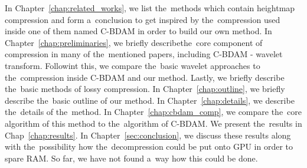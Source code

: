 In Chapter~\ref{chap:related_works}, we list the~methods which contain heightmap compression and form a~conclusion to get inspired by the~compression used inside one of them named C-BDAM in order to build our own method. In Chapter~\ref{chap:preliminaries}, we briefly describethe~core component of compression in many of the~mentioned papers, including C-BDAM - wavelet transform. Followint this, we compare the~basic wavelet approaches to the~compression inside C-BDAM and our method. Lastly, we briefly describe the~basic methods of lossy compression. In Chapter~\ref{chap:outline}, we briefly describe the~basic outline of our method. In Chapter~\ref{chap:details}, we describe the~details of the~method. In Chapter~\ref{chap:cbdam_comp}, we compare the~core algorithm of this method to the~algorithm of C-BDAM. We present the~results in Chap~\ref{chap:results}. In Chapter~\ref{sec:conclusion}, we discuss these results along with the~possibility how the~decompression could be put onto GPU in order to spare RAM. So far, we have not found a~way how this could be done.